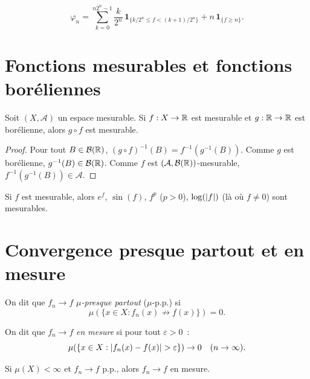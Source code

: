 \begin{formules}[title=\textbf{Construction de l'approximation}]
\[
\varphi_n = \sum_{k=0}^{n2^n - 1} \frac{k}{2^n}\, \mathbf{1}_{\{k/2^n \leq f <
(k+1)/2^n\}} + n\, \mathbf{1}_{\{f \geq n\}}.
\]
\end{formules}

\section{Fonctions mesurables et fonctions bor\'eliennes}

\begin{proposition}
Soit $(X, \mathcal{A})$ un espace mesurable. Si $f : X \to \mathbb{R}$ est mesurable et
$g : \mathbb{R} \to \mathbb{R}$ est bor\'elienne, alors $g \circ f$ est mesurable.
\end{proposition}

\begin{proof}
Pour tout $B \in \mathcal{B}(\mathbb{R})$, $(g \circ f)^{-1}(B) = f^{-1}(g^{-1}(B))$.
Comme $g$ est bor\'elienne, $g^{-1}(B) \in \mathcal{B}(\mathbb{R})$. Comme $f$ est
$(\mathcal{A}, \mathcal{B}(\mathbb{R}))$-mesurable, $f^{-1}(g^{-1}(B)) \in \mathcal{A}$.
\end{proof}

\begin{corollaire}
Si $f$ est mesurable, alors $e^f$, $\sin(f)$, $f^p$ ($p > 0$), $\log(\left| f \right|)$
(l\`a o\`u $f \neq 0$) sont mesurables.
\end{corollaire}

\section{Convergence presque partout et en mesure}

\begin{definition}
On dit que $f_n \to f$ \emph{$\mu$-presque partout} ($\mu$-p.p.) si
\[
\mu\!\left(\{x \in X : f_n(x) \not\to f(x)\}\right) = 0.
\]
\end{definition}

\begin{definition}
On dit que $f_n \to f$ \emph{en mesure} si pour tout $\varepsilon > 0$~:
\[
\mu\!\left(\{x \in X : \left| f_n(x) - f(x) \right| > \varepsilon\}\right) \to 0
\quad (n \to \infty).
\]
\end{definition}

\begin{theoreme}
Si $\mu(X) < \infty$ et $f_n \to f$ p.p., alors $f_n \to f$ en mesure.
\end{theoreme}

